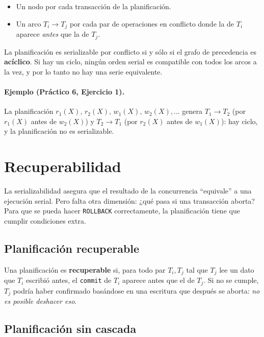 \documentclass[11pt,a4paper]{article}
\begin{document}
\begin{itemize}
    \item Un nodo por cada transacción de la planificación.
    \item Un arco $T_i \rightarrow T_j$ por cada par de operaciones en
    conflicto donde la de $T_i$ aparece \emph{antes} que la de $T_j$.
\end{itemize}

\begin{nota}
La planificación es serializable por conflicto si y sólo si el grafo
de precedencia es \textbf{acíclico}. Si hay un ciclo, ningún orden serial
es compatible con todos los arcos a la vez, y por lo tanto no hay una
serie equivalente.
\end{nota}

\paragraph{Ejemplo (Práctico 6, Ejercicio 1).}
La planificación
$r_1(X),\, r_2(X),\, w_1(X),\, w_2(X),\ldots$
genera $T_1 \rightarrow T_2$ (por $r_1(X)$ antes de $w_2(X)$) y
$T_2 \rightarrow T_1$ (por $r_2(X)$ antes de $w_1(X)$): hay ciclo,
y la planificación no es serializable.

\section{Recuperabilidad}

La serializabilidad asegura que el resultado de la concurrencia
``equivale'' a una ejecución serial. Pero falta otra dimensión: ¿qué pasa
si una transacción aborta? Para que se pueda hacer \texttt{ROLLBACK}
correctamente, la planificación tiene que cumplir condiciones extra.

\subsection{Planificación recuperable}

Una planificación es \textbf{recuperable} si, para todo par $T_i, T_j$
tal que $T_j$ lee un dato que $T_i$ escribió antes, el \texttt{commit}
de $T_i$ aparece antes que el de $T_j$. Si no se cumple, $T_j$ podría
haber confirmado basándose en una escritura que después se aborta:
\emph{no es posible deshacer eso}.

\subsection{Planificación sin cascada}
\end{document}
